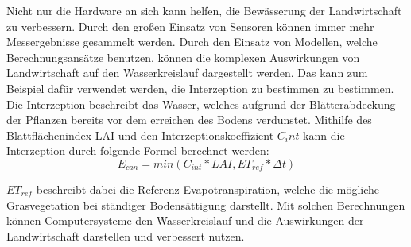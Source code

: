 Nicht nur die Hardware an sich kann helfen, die Bewässerung der Landwirtschaft
zu verbessern. Durch den großen Einsatz von Sensoren können immer mehr
Messergebnisse gesammelt werden. Durch den Einsatz von Modellen, welche
Berechnungsansätze benutzen, können die komplexen Auswirkungen von
Landwirtschaft auf den Wasserkreislauf dargestellt werden. Das kann zum
Beispiel dafür verwendet werden, die Interzeption zu bestimmen zu bestimmen.
Die Interzeption beschreibt das Wasser, welches aufgrund der Blätterabdeckung
der Pflanzen bereits vor dem erreichen des Bodens verdunstet. Mithilfe des
Blattflächenindex LAI und den Interzeptionskoeffizient $C_int$ kann die
Interzeption durch folgende Formel berechnet werden: \\
\begin{equation}
    E_{can} = min(C_{int} * LAI,ET_{ref} * \Delta t)
\end{equation}

$ET_{ref}$ beschreibt dabei die Referenz-Evapotranspiration, welche die mögliche Grasvegetation bei ständiger Bodensättigung darstellt.\cite{keilholz2019bewasserung}
Mit solchen Berechnungen können Computersysteme den Wasserkreislauf und die Auswirkungen der Landwirtschaft darstellen und verbessert nutzen.